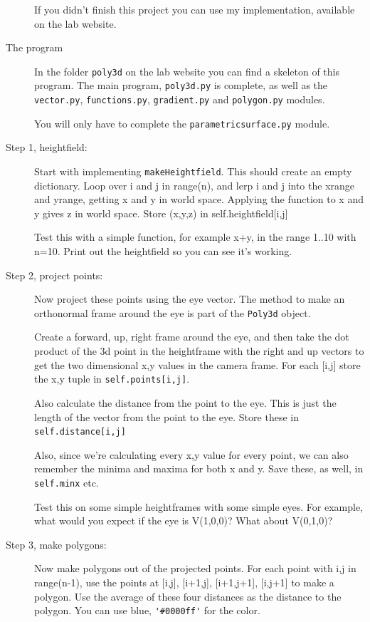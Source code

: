 \documentclass[12pt]{article}
\begin{document}
\begin{description}
If you didn't finish this project you can use my implementation,
available on the lab website.

\item[The program]  In the folder \lstinline{poly3d} on the
lab website you can find a skeleton of this program.  The main
program, \lstinline{poly3d.py} is complete, as well as the 
\lstinline{vector.py}, \lstinline{functions.py}, \lstinline{gradient.py}
 and \lstinline{polygon.py}
modules.

You will only have to complete the \lstinline{parametricsurface.py} module.

\item[Step 1, heightfield:]  
Start with implementing \lstinline{makeHeightfield}.  
This should create an empty dictionary.  Loop over
i and j in range(n), and lerp i and j into the xrange 
and yrange, getting x and y in world space.
Applying the function to x and y gives z in world
space.  Store (x,y,z) in self.heightfield[i,j]

Test this with a simple function, for example x+y,
in the range 1..10 with n=10.  Print out the heightfield
so you can see it's working.

\item[Step 2, project points:] 
Now project these points using the eye vector.
The method to make an orthonormal frame around 
the eye is part of the \lstinline{Poly3d} object.

Create a forward, up, right frame around the eye,
and then take the dot product of the 3d point in the heightframe
with the right and up vectors to get the two dimensional
x,y values in the camera frame.  For each [i,j]
store the x,y tuple in \lstinline{self.points[i,j]}.

Also calculate the distance from the point to the eye.
This is just the length of the vector from the point to the eye.
Store these in \lstinline{self.distance[i,j]}

Also, since we're calculating every x,y value for every point,
we can also remember the minima and maxima for both
x and y.  Save these, as well, in \lstinline{self.minx} etc.

Test this on some simple heightframes with some simple
eyes.  For example, what would you expect if the eye 
is V(1,0,0)?  What about V(0,1,0)?

\item[Step 3, make polygons:]
Now make polygons out of the projected points.
For each point with i,j in range(n-1), use the points
at [i,j], [i+1,j], [i+1,j+1], [i,j+1] to make a polygon.
Use the average of these four distances as the
distance to the polygon.  You can use blue, \lstinline{'#0000ff'}
for the color.


\end{description}
\end{document}
